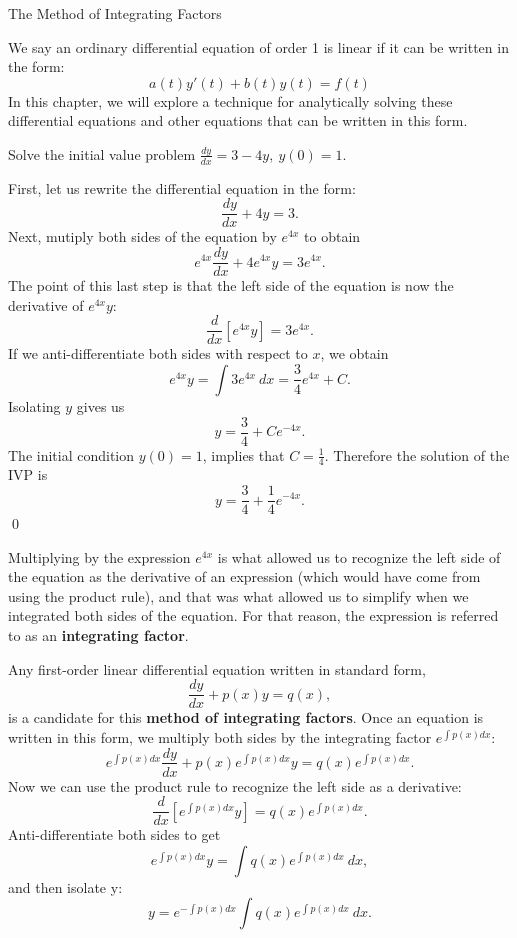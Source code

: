 \documentclass[12pt,letterpaper,twoside]{amsart}
\newcounter{example}
\newcounter{exercise}
\newcounter{problem}
\newcommand{\example}{\bigskip \noindent {\large {\sc Example \arabic{example}:}} \addtocounter{example}{1}}
\begin{document}
\sffamily

\begin{center} {\LARGE The Method of Integrating Factors} \end{center}

\setcounter{example}{1}
\setcounter{exercise}{1}

We say an ordinary differential equation of order 1 is linear if it can be written in the form:
\begin{equation} a(t)y'(t)+b(t)y(t)=f(t) \label{firstorderlinear} \end{equation}
In this chapter, we will explore a technique for analytically solving these differential equations and other equations that can be written in this form.

\example Solve the initial value problem $\frac{dy}{dx} = 3-4y, \ y(0)=1$.

First, let us rewrite the differential equation in the form:
\[ \frac{dy}{dx}+4y=3.\]
Next, mutiply both sides of the equation by $e^{4x}$ to obtain
\[ e^{4x} \frac{dy}{dx} + 4e^{4x} y = 3e^{4x}.\]
The point of this last step is that the left side of the equation is now the derivative of $e^{4x}y$:
\[ \frac{d}{dx}\left[ e^{4x} y \right] = 3e^{4x}.\]
If we anti-differentiate both sides with respect to $x$, we obtain
\[ e^{4x} y = \int 3e^{4x} \ dx = \frac{3}{4} e^{4x} + C.\]
Isolating $y$ gives us
\[ y = \frac{3}{4} + Ce^{-4x}.\]
The initial condition $y(0)=1$, implies that $C = \frac{1}{4}$.  Therefore the solution of the IVP is
\[ y=\frac{3}{4}+\frac{1}{4}e^{-4x}.\]
\qed

Multiplying by the expression $e^{4x}$ is what allowed us to recognize the left side of the equation as the derivative of an expression (which would have come from using the product rule), and that was what allowed us to simplify when we integrated both sides of the equation.  For that reason, the expression is referred to as an {\bf integrating factor}.

Any first-order linear differential equation written in standard form, 
\begin{equation} \frac{dy}{dx}+p(x)y=q(x),\label{standardfirstorderlinear} \end{equation}
is a candidate for this {\bf method of integrating factors}.  Once an equation is written in this form, we multiply both sides by the integrating factor $e^{\int p(x) dx}$:
\[ e^{\int p(x) dx} \frac{dy}{dx} + p(x) e^{\int p(x) dx} y = q(x) e^{\int p(x) dx}.\]
Now we can use the product rule to recognize the left side as a derivative:
\[ \frac{d}{dx} \left[ e^{\int p(x) dx} y \right] = q(x) e^{\int p(x) dx}.\]
Anti-differentiate both sides to get
\[ e^{\int p(x) dx} y = \int q(x) e^{\int p(x) dx} \ dx,\]
and then isolate y:
\[ y = e^{-\int p(x) dx } \int q(x) e^{\int p(x) dx} \ dx.\]
\end{document}
